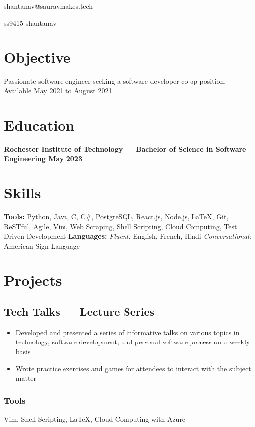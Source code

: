 \documentclass[11pt, letterpaper]{article}
\makeatletter
\renewcommand{\maketitle} {
    \thispagestyle{empty}
    \begin{center}    
        {\huge\bfseries \theauthor}

        {\large shantanav@sauravmakes.tech}

        \faGithub \hspace{4px} {\large ss9415} \hspace{10px} \faLinkedin \hspace{4px} {\large shantanav}

    \end{center}
}
\makeatother
\begin{document}
    \author{Shantanav Saurav}
    \maketitle

    \section{Objective}
        Passionate software engineer seeking a software developer co-op position. Available
        May 2021 to August 2021
    \section{Education}
        \textbf{Rochester Institute of Technology --- 
        Bachelor of Science in Software Engineering \hfill May 2023}

    \section{Skills}
        \textbf{Tools:}
            Python, Java, C, C\#, PostgreSQL, React.js, Node.js, LaTeX, Git, ReSTful, Agile, Vim,
            Web Scraping, Shell Scripting, Cloud Computing, Test Driven Development \newline
        \textbf{Languages:} \hspace{0px}
            \emph{Fluent:} English, French, Hindi \hspace{4px}
            \emph{Conversational:} American Sign Language

    \section{Projects}
        \subsection{Tech Talks --- Lecture Series}
            \begin{itemize}[nosep]
                \item Developed and presented a series of informative talks on various topics in technology, 
                    software development, and personal software process on a weekly basis
                \item Wrote practice exercises and games for attendees to interact with the subject matter
            \end{itemize}
            \subsubsection{Tools}
                Vim, Shell Scripting, LaTeX, Cloud Computing with Azure
\end{document}
